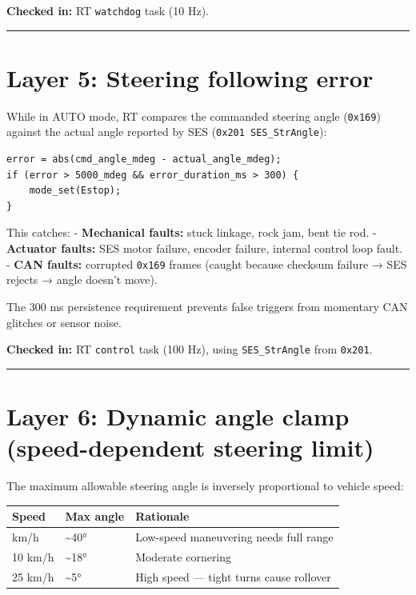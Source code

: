 \documentclass[12pt,a4paper,oneside]{report}
\begin{document}
\textbf{Checked in:} RT \texttt{watchdog} task (10 Hz).

\begin{center}\rule{0.5\linewidth}{0.5pt}\end{center}

\section{Layer 5: Steering following
error}\label{layer-5-steering-following-error}

While in AUTO mode, RT compares the commanded steering angle (\texttt{0x169})
against the actual angle reported by SES (\texttt{0x201\ SES\_StrAngle}):

\begin{verbatim}
error = abs(cmd_angle_mdeg - actual_angle_mdeg);
if (error > 5000_mdeg && error_duration_ms > 300) {
    mode_set(Estop);
}
\end{verbatim}

This catches: - \textbf{Mechanical faults:} stuck linkage, rock jam, bent tie
rod. - \textbf{Actuator faults:} SES motor failure, encoder failure, internal
control loop fault. - \textbf{CAN faults:} corrupted \texttt{0x169} frames
(caught because checksum failure → SES rejects → angle doesn't move).

The 300 ms persistence requirement prevents false triggers from momentary CAN
glitches or sensor noise.

\textbf{Checked in:} RT \texttt{control} task (100 Hz), using
\texttt{SES\_StrAngle} from \texttt{0x201}.

\begin{center}\rule{0.5\linewidth}{0.5pt}\end{center}

\section{Layer 6: Dynamic angle clamp (speed-dependent steering
limit)}\label{layer-6-dynamic-angle-clamp-speed-dependent-steering-limit}

The maximum allowable steering angle is inversely proportional to vehicle speed:

\begin{longtable}[]{@{}lll@{}}
\toprule\noalign{}
Speed & Max angle & Rationale \\
\midrule\noalign{}
\endhead
\bottomrule\noalign{}
\endlastfoot
2 km/h & \textasciitilde40° & Low-speed maneuvering needs full range \\
10 km/h & \textasciitilde18° & Moderate cornering \\
25 km/h & \textasciitilde5° & High speed --- tight turns cause rollover \\
\end{longtable}
\end{document}

